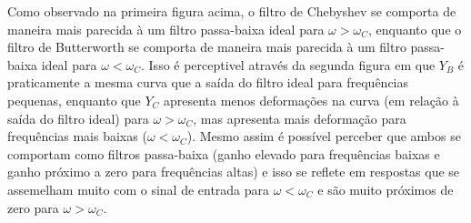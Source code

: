 \documentclass{article}
\begin{document}
\begin{enumerate}[(a)]
 Como observado na primeira figura acima, o filtro de Chebyshev se comporta de maneira mais parecida à um filtro passa-baixa ideal para $\omega > \omega_C$, enquanto que o filtro de Butterworth se comporta de maneira mais parecida à um filtro passa-baixa ideal para $\omega < \omega_C$. Isso é perceptivel através da segunda figura em que $Y_B$ é praticamente a mesma curva que a saída do filtro ideal para frequências pequenas, enquanto que $Y_C$ apresenta menos deformações na curva (em relação à saída do filtro ideal) para $\omega > \omega_C$, mas apresenta mais deformação para frequências mais baixas ($\omega < \omega_C$). Mesmo assim é possível perceber que ambos se comportam como filtros passa-baixa (ganho elevado para frequências baixas e ganho próximo a zero para frequências altas) e isso se reflete em respostas que se assemelham muito com o sinal de entrada para $\omega < \omega_C$ e são muito próximos de zero para $\omega > \omega_C$.

\end{enumerate}
\end{document}
